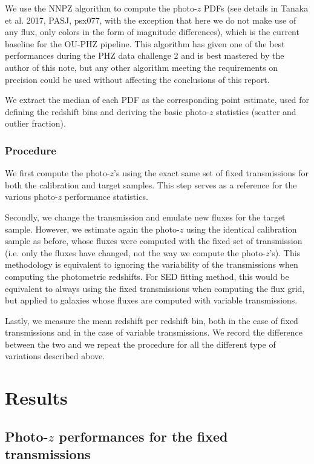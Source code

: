 \documentclass[11pt]{article}
\begin{document}
We use the NNPZ algorithm to compute the photo-\(z\) PDFs (see details
in Tanaka et al. 2017, PASJ, psx077, with the exception that here we do
not make use of any flux, only colors in the form of magnitude
differences), which is the current baseline for the OU-PHZ pipeline.
This algorithm has given one of the best performances during the PHZ
data challenge 2 and is best mastered by the author of this note, but
any other algorithm meeting the requirements on precision could be used
without affecting the conclusions of this report.

We extract the median of each PDF as the corresponding point estimate,
used for defining the redshift bins and deriving the basic photo-\(z\)
statistics (scatter and outlier fraction).

\subsubsection{Procedure}\label{procedure}

We first compute the photo-\(z\)'s using the exact same set of fixed
transmissions for both the calibration and target samples. This step
serves as a reference for the various photo-\(z\) performance
statistics.

Secondly, we change the transmission and emulate new fluxes for the
target sample. However, we estimate again the photo-\(z\) using the
identical calibration sample as before, whose fluxes were computed with
the fixed set of transmission (i.e. only the fluxes have changed, not
the way we compute the photo-\(z\)'s). This methodology is equivalent to
ignoring the variability of the transmissions when computing the
photometric redshifts. For SED fitting method, this would be equivalent
to always using the fixed transmissions when computing the flux grid,
but applied to galaxies whose fluxes are computed with variable
transmissions.

Lastly, we measure the mean redshift per redshift bin, both in the case
of fixed transmissions and in the case of variable transmissions. We
record the difference between the two and we repeat the procedure for
all the different type of variations described above.

    \section{Results}\label{results}

\subsection{\texorpdfstring{Photo-\(z\) performances for the fixed
transmissions}{Photo-z performances for the fixed transmissions}}\label{photo-z-performances-for-the-fixed-transmissions}
\end{document}
